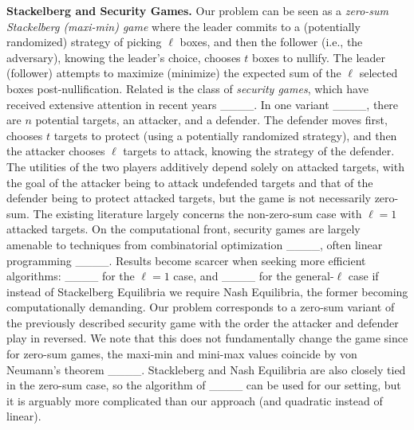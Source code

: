 \noindent \textbf{Stackelberg and Security Games.} Our problem can be seen as a \emph{zero-sum Stackelberg (maxi-min) game} where the leader commits to a (potentially randomized) strategy of picking $\ell$ boxes, and then the follower (i.e., the adversary), knowing the leader's choice, chooses $t$ boxes to nullify. The leader (follower) attempts to maximize (minimize) the expected sum of the $\ell$ selected boxes post-nullification.
Related is the class of \emph{security games}, which have received extensive attention in recent years ____. In one variant ____, there are $n$ potential targets, an attacker, and a defender. The defender moves first, chooses $t$ targets to protect (using a potentially randomized strategy), and then the attacker chooses $\ell$ targets to attack, knowing the strategy of the defender. The utilities of the two players additively depend solely on attacked targets, with the goal of the attacker being to attack undefended targets and that of the defender being to protect attacked
targets, but the game is not necessarily zero-sum. The existing literature largely concerns the non-zero-sum case with $\ell = 1$ attacked targets. On the computational front, security games are largely amenable to techniques from combinatorial optimization ____, often linear programming ____. Results become scarcer when seeking more efficient algorithms: ____ for the $\ell = 1$ case, and ____ for the general-$\ell$ case if instead of Stackelberg Equilibria we require Nash Equilibria, the former becoming computationally demanding. Our problem corresponds to a zero-sum variant of the previously described security game with the order the attacker and defender play in reversed. We note that this does not fundamentally change the game since for zero-sum games, the maxi-min and mini-max values coincide by von Neumann's theorem ____. Stackleberg and Nash Equilibria are also closely tied in the zero-sum case, so the algorithm of ____ can be used for our setting, but it is arguably more complicated than our approach (and quadratic instead of linear).

